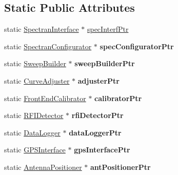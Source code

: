 \subsection*{Static Public Attributes}
\begin{DoxyCompactItemize}
\item 
static \hyperlink{classSpectranInterface}{Spectran\+Interface} $\ast$ \hyperlink{classSignalHandler_a855d0b79fcbacf50e4a1d12bd5d1bf53}{spec\+Interf\+Ptr}
\item 
\mbox{\label{classSignalHandler_a0b9c75b3e3c928c01cc5e44d42e5ac38}} 
static \hyperlink{classSpectranConfigurator}{Spectran\+Configurator} $\ast$ {\bfseries spec\+Configurator\+Ptr}
\item 
\mbox{\label{classSignalHandler_a23ec28699521fb435a5eb90f2c36bccb}} 
static \hyperlink{classSweepBuilder}{Sweep\+Builder} $\ast$ {\bfseries sweep\+Builder\+Ptr}
\item 
\mbox{\label{classSignalHandler_ab3328bb82a0e67153d8ff39bf04c7196}} 
static \hyperlink{classCurveAdjuster}{Curve\+Adjuster} $\ast$ {\bfseries adjuster\+Ptr}
\item 
\mbox{\label{classSignalHandler_ae5bbe309adfefeb3b7e9ebf31d32b763}} 
static \hyperlink{classFrontEndCalibrator}{Front\+End\+Calibrator} $\ast$ {\bfseries calibrator\+Ptr}
\item 
\mbox{\label{classSignalHandler_a9ce3533694e1e412496dc5a9b339ccc3}} 
static \hyperlink{classRFIDetector}{R\+F\+I\+Detector} $\ast$ {\bfseries rfi\+Detector\+Ptr}
\item 
\mbox{\label{classSignalHandler_a114e600bdc2ad95efbc2991c97f3732c}} 
static \hyperlink{classDataLogger}{Data\+Logger} $\ast$ {\bfseries data\+Logger\+Ptr}
\item 
\mbox{\label{classSignalHandler_ac6bc3decceefdff9d3e5c15e4125fe08}} 
static \hyperlink{classGPSInterface}{G\+P\+S\+Interface} $\ast$ {\bfseries gps\+Interface\+Ptr}
\item 
\mbox{\label{classSignalHandler_a04f82481d0f5795308e6e2cef7bb0f88}} 
static \hyperlink{classAntennaPositioner}{Antenna\+Positioner} $\ast$ {\bfseries ant\+Positioner\+Ptr}

\end{DoxyCompactItemize}
